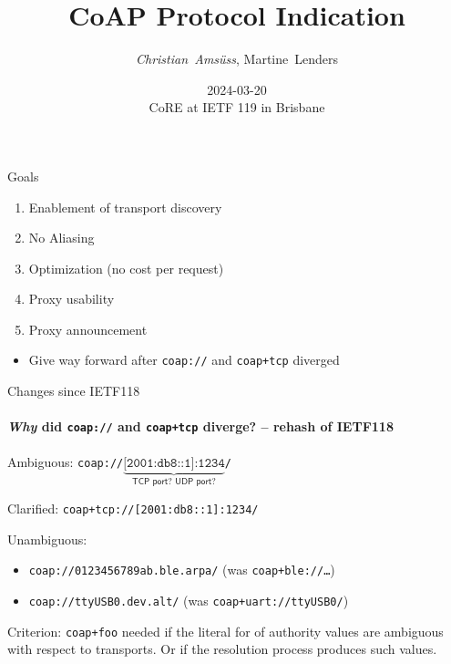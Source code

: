 

\title{CoAP Protocol Indication}
\subtitle{}
\author{\textit{Christian~Amsüss}, Martine~Lenders}
\date{2024-03-20 \\CoRE at IETF 119 in Brisbane}



\frame{\titlepage}

\begin{frame}{Goals}\Large
  \begin{enumerate}
    \item Enablement of transport discovery
    \item No Aliasing
    \item Optimization (no cost per request)
    \item Proxy usability
    \item Proxy announcement
  \end{enumerate}

  \bigskip

  \begin{itemize}
    \item Give way forward after \texttt{coap://} and \texttt{coap+tcp} diverged
  \end{itemize}
\end{frame}

\begin{frame}{Changes since IETF118}\large
  \framesubtitle{\textit{Why} did \texttt{coap://} and \texttt{coap+tcp} diverge? -- rehash of IETF118}

  Ambiguous: \texttt{coap://$\underbrace{\texttt{[2001:db8::1]:1234}}_{\textsf{TCP port? UDP port?}}$/}

  Clarified: \texttt{coap+tcp://[2001:db8::1]:1234/}

  \bigskip

  Unambiguous:
  \begin{itemize}
    \item \texttt{coap://0123456789ab.ble.arpa/} (was \texttt{coap+ble://\ldots})
    \item \texttt{coap://ttyUSB0.dev.alt/} (was \texttt{coap+uart://ttyUSB0/})
  \end{itemize}

  \bigskip

  Criterion: \texttt{coap+foo} needed if the literal for of authority values are ambiguous with respect to transports. Or if the resolution process produces such values.
\end{frame}

